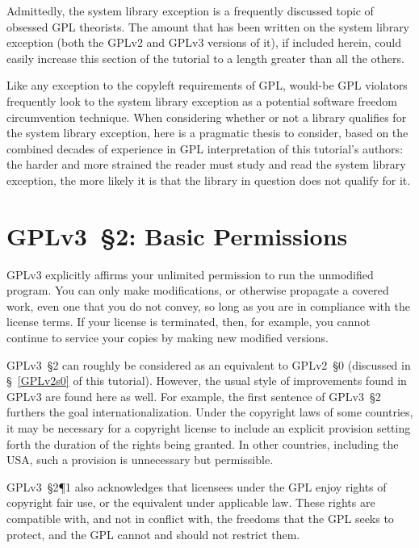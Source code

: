 Admittedly, the system library exception is a frequently discussed topic of
obsessed GPL theorists.  The amount that has been written on the system
library exception (both the GPLv2 and GPLv3 versions of it), if included
herein,  could easily increase this section of the tutorial to a length
greater than all the others.

Like any exception to the copyleft requirements of GPL, would-be GPL
violators frequently look to the system library exception as a potential
software freedom circumvention technique.  When considering whether or not a
library qualifies for the system library exception, here is a pragmatic
thesis to consider, based on the combined decades of experience in GPL
interpretation of this tutorial's authors: the harder and more strained the
reader must study and read the system library exception, the more likely it
is that the library in question does not qualify for it.

\section{GPLv3~\S2: Basic Permissions}
\label{GPLv3S2}

GPLv3 explicitly affirms your unlimited permission to run the
unmodified program. You can only make modifications, or otherwise propagate a
covered work, even one that you do not convey, so long as you are in
compliance with the license terms. If your license is terminated, then, for
example, you cannot continue to service your copies by making new modified
versions.

GPLv3~\S2 can roughly be considered as an equivalent to GPLv2~\S0 (discussed
in \S~\ref{GPLv2s0} of this tutorial).  However, the usual style of
improvements found in GPLv3 are found here as well.  For example, the first
sentence of GPLv3~\S2 furthers the goal internationalization.  Under the
copyright laws of some countries, it may be necessary for a copyright license
to include an explicit provision setting forth the duration of the rights
being granted. In other countries, including the USA, such a provision is
unnecessary but permissible.

GPLv3~\S2\P1 also acknowledges that licensees under the GPL enjoy rights of
copyright fair use, or the equivalent under applicable law.  These rights are
compatible with, and not in conflict with, the freedoms that the GPL seeks to
protect, and the GPL cannot and should not restrict them.

